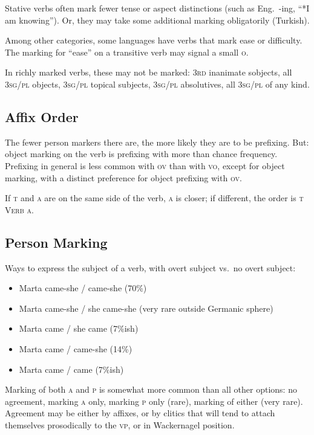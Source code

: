 \documentclass[11pt]{article}
\newcommand{\I}[1]{\textsc{#1}}   %
\newenvironment{grammarlist}%
 {\begin{itemize}\addtolength{\itemsep}{-0.5\baselineskip}\ignorespaces}%
 {\end{itemize}\ignorespacesafterend}
\begin{document}
Stative verbs often mark fewer tense or aspect distinctions (such as
Eng.\ -ing, ``*I am knowing''). Or, they may take some additional
marking obligatorily (Turkish).

Among other categories, some languages have verbs that mark ease or
difficulty.  The marking for ``ease'' on a transitive verb may signal
a small \I{o}.

In richly marked verbs, these may not be marked: \I{3rd} inanimate
sobjects, all \I{3sg/pl} objects, \I{3sg/pl} topical subjects,
\I{3sg/pl} absolutives, all \I{3sg/pl} of any kind.


\subsection{Affix Order}
The fewer person markers there are, the more likely they are to be
prefixing.  But: object marking on the verb is prefixing with more
than chance frequency.  Prefixing in general is less common with
\I{ov} than with \I{vo}, except for object marking, with a distinct
preference for object prefixing with \I{ov}.

If \I{t} and \I{a} are on the same side of the verb, \I{a} is closer;
if different, the order is \I{t Verb a}.

\subsection{Person Marking}
Ways to express the subject of a verb, with overt subject vs.\ no
overt subject:
\begin{grammarlist}
  \item Marta came-she / came-she (70\%)
  \item Marta came-she / she came-she (very rare outside Germanic sphere)
  \item Marta came / she came (7\%ish)
  \item Marta came / came-she (14\%)
  \item Marta came / came (7\%ish)
\end{grammarlist}

Marking of both \I{a} and \I{p} is somewhat more common than all other
options: no agreement, marking \I{a} only, marking \I{p} only (rare),
marking of either (very rare).  Agreement may be either by affixes, or
by clitics that will tend to attach themselves prosodically to the
\I{vp}, or in Wackernagel position.
\end{document}
